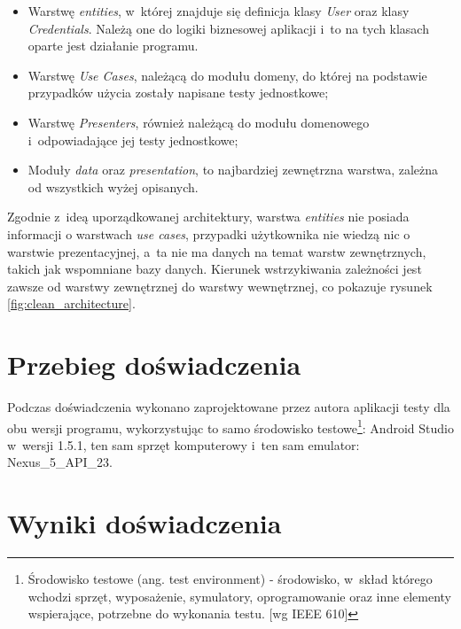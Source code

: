 \begin{itemize}
\item
Warstwę \textit{entities}, w~której znajduje się definicja klasy \textit{User} oraz klasy \textit{Credentials}. Należą one do logiki biznesowej aplikacji i~to na tych klasach oparte jest działanie programu. 

\item
Warstwę \textit{Use Cases}, należącą do modułu domeny, do której na podstawie przypadków użycia zostały napisane testy jednostkowe;

\item
Warstwę \textit{Presenters}, również należącą do modułu domenowego i~odpowiadające jej testy jednostkowe; 

\item
Moduły \textit{data} oraz \textit{presentation}, to najbardziej zewnętrzna warstwa, zależna od wszystkich wyżej opisanych. 
\end{itemize}

Zgodnie z~ideą uporządkowanej architektury, warstwa \textit{entities} nie posiada informacji o warstwach \textit{use cases}, przypadki użytkownika nie wiedzą nic o warstwie prezentacyjnej, a~ta nie ma danych na temat warstw zewnętrznych, takich jak wspomniane bazy danych. Kierunek wstrzykiwania zależności jest zawsze od warstwy zewnętrznej do warstwy wewnętrznej, co pokazuje rysunek \ref{fig:clean_architecture}.

\section{Przebieg doświadczenia}
Podczas doświadczenia wykonano zaprojektowane przez autora aplikacji testy dla obu wersji programu, wykorzystując to samo środowisko testowe\footnote{Środowisko testowe (ang. test environment) - środowisko, w~skład którego wchodzi sprzęt, wyposażenie, symulatory, oprogramowanie oraz inne elementy wspierające, potrzebne do wykonania testu. [wg IEEE 610]}: Android Studio w~wersji 1.5.1, ten sam sprzęt komputerowy i~ten sam emulator: Nexus\_5\_API\_23.

\section{Wyniki doświadczenia}
\label{wyniki_doswiadczenia}
